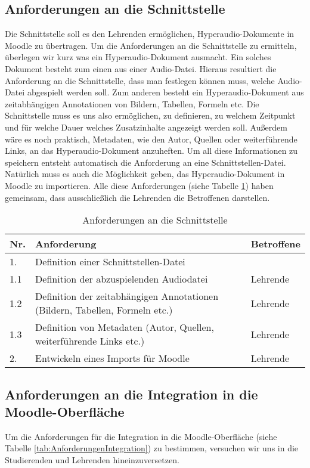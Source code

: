 \subsection{Anforderungen an die Schnittstelle}
Die Schnittstelle soll es den Lehrenden ermöglichen, Hyperaudio-Dokumente in Moodle zu übertragen. Um die Anforderungen an die Schnittstelle zu ermitteln, überlegen wir kurz was ein Hyperaudio-Dokument ausmacht. Ein solches Dokument besteht zum einen aus einer Audio-Datei. Hieraus resultiert die Anforderung an die Schnittstelle, dass man festlegen können muss, welche Audio-Datei abgespielt werden soll. Zum anderen besteht ein Hyperaudio-Dokument aus zeitabhängigen Annotationen von Bildern, Tabellen, Formeln etc. Die Schnittstelle muss es uns also ermöglichen, zu definieren, zu welchem Zeitpunkt und für welche Dauer welches Zusatzinhalte angezeigt werden soll. Außerdem wäre es noch praktisch, Metadaten, wie den Autor, Quellen oder weiterführende Links, an das Hyperaudio-Dokument anzuheften. Um all diese Informationen zu speichern entsteht automatisch die Anforderung an eine Schnittstellen-Datei. Natürlich muss es auch die Möglichkeit geben, das Hyperaudio-Dokument in Moodle zu importieren. Alle diese Anforderungen (siehe Tabelle \ref{tab:AnforderungenSchnittstelle}) haben gemeinsam, dass ausschließlich die Lehrenden die Betroffenen darstellen.

\begin{table}[!ht]
\def\arraystretch{1.4}
\caption{Anforderungen an die Schnittstelle}
\label{tab:AnforderungenSchnittstelle}
 \begin{tabularx}{\textwidth}{lXl}      
    \hline
    Nr. & Anforderung & Betroffene 
    \\\hline
    1. & Definition einer Schnittstellen-Datei & \\
    1.1 & Definition der abzuspielenden Audiodatei & Lehrende\\
    1.2 & Definition der zeitabhängigen Annotationen (Bildern, Tabellen, Formeln etc.) & Lehrende\\
    1.3 & Definition von Metadaten (Autor, Quellen, weiterführende Links etc.) & Lehrende\\
    2. & Entwickeln eines Imports für Moodle & Lehrende\\
    \hline
    \end{tabularx}
\end{table}

\subsection{Anforderungen an die Integration in die Moodle-Oberfläche}
\label{sub:AnforderungenOberflaeche}
Um die Anforderungen für die Integration in die Moodle-Oberfläche (siehe Tabelle \ref{tab:AnforderungenIntegration}) zu bestimmen, versuchen wir uns in die Studierenden und Lehrenden hineinzuversetzen. 

